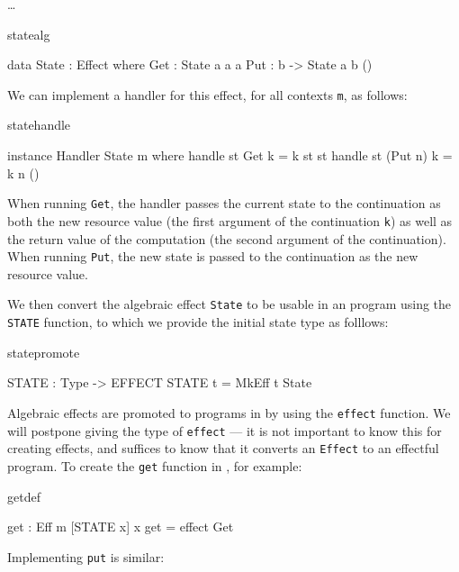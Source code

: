 \ldots

\begin{SaveVerbatim}{statealg}

data State : Effect where
     Get :      State a a a
     Put : b -> State a b ()

\end{SaveVerbatim}

We can implement a handler for this effect, for all contexts \texttt{m},
as follows:

\begin{SaveVerbatim}{statehandle}

instance Handler State m where
     handle st Get     k = k st st
     handle st (Put n) k = k n ()

\end{SaveVerbatim}

\noindent
When running \texttt{Get}, the handler passes the current state to the
continuation as both the new resource value (the first argument of the
continuation \texttt{k}) as well as the return value of the computation (the
second argument of the continuation). When running \texttt{Put}, the new state
is passed to the continuation as the new resource value.

We then convert the algebraic effect \texttt{State} to be usable in an
\Eff{} program using the \texttt{STATE} function, to which we provide the
initial state type as folllows:

\begin{SaveVerbatim}{statepromote}

STATE : Type -> EFFECT
STATE t = MkEff t State

\end{SaveVerbatim}

\noindent
Algebraic effects are promoted to programs in \Eff{} by using the
\texttt{effect} function. We will postpone giving the type of
\texttt{effect} --- it is not important to know this for creating effects,
and suffices to know that it converts an \texttt{Effect} to an effectful
program. To create the \texttt{get} function in \Eff{}, for example:

\begin{SaveVerbatim}{getdef}

get : Eff m [STATE x] x
get = effect Get 

\end{SaveVerbatim}

\noindent
Implementing \texttt{put} is similar:


